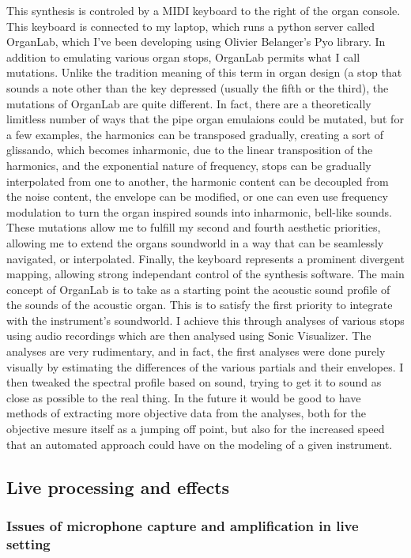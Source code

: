 \documentclass[12pt,twoside,maitrise]{dms_ks}
\theoremstyle{definition}
\begin{document}
{This synthesis is controled by a MIDI keyboard to the right of the organ console. 
This keyboard is connected to my laptop, which runs a python server called OrganLab, which I've been developing using Olivier Belanger's Pyo library. 
In addition to emulating various organ stops, OrganLab permits what I call mutations. 
Unlike the tradition meaning of this term in organ design (a stop that sounds a note other than the key depressed (usually the fifth or the third), the mutations of OrganLab are quite different. 
In fact, there are a theoretically limitless number of ways that the pipe organ emulaions could be mutated, but for a few examples, the harmonics can be transposed gradually, creating a sort of glissando, which becomes inharmonic, due to the linear transposition of the harmonics, and the exponential nature of frequency, stops can be gradually interpolated from one to another, the harmonic content can be decoupled from the noise content, the envelope can be modified, or one can even use frequency modulation to turn the organ inspired sounds into inharmonic, bell-like sounds. 
These mutations allow me to fulfill my second and fourth aesthetic priorities, allowing me to extend the organs soundworld in a way that can be seamlessly navigated, or interpolated. 
Finally, the keyboard represents a prominent divergent mapping, allowing strong independant control of the synthesis software.  
The main concept of OrganLab is to take as a starting point the acoustic sound profile of the sounds of the acoustic organ. 
This is to satisfy the first priority to integrate with the instrument's soundworld. 
I achieve this through analyses of various stops using audio recordings which are then analysed using Sonic Visualizer. 
The analyses are very rudimentary, and in fact, the first analyses were done purely visually by estimating the differences of the various partials and their envelopes. 
I then tweaked the spectral profile based on sound, trying to get it to sound as close as possible to the real thing. 
In the future it would be good to have methods of extracting more objective data from the analyses, both for the objective mesure itself as a jumping off point, but also for the increased speed that an automated approach could have on the modeling of a given instrument.   

\subsection{Live processing and effects}

\subsubsection{Issues of microphone capture and amplification in live setting}

}
\end{document}
